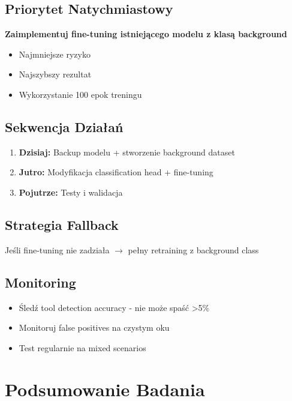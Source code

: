 \documentclass[12pt,a4paper]{article}
\begin{document}
\subsection{Priorytet Natychmiastowy}

\textbf{Zaimplementuj fine-tuning istniejącego modelu z klasą background}
\begin{itemize}
    \item Najmniejsze ryzyko
    \item Najszybszy rezultat
    \item Wykorzystanie 100 epok treningu
\end{itemize}

\subsection{Sekwencja Działań}

\begin{enumerate}
    \item \textbf{Dzisiaj:} Backup modelu + stworzenie background dataset
    \item \textbf{Jutro:} Modyfikacja classification head + fine-tuning
    \item \textbf{Pojutrze:} Testy i walidacja
\end{enumerate}

\subsection{Strategia Fallback}

Jeśli fine-tuning nie zadziała $\rightarrow$ pełny retraining z background class

\subsection{Monitoring}

\begin{itemize}
    \item Śledź tool detection accuracy - nie może spaść >5\%
    \item Monitoruj false positives na czystym oku
    \item Test regularnie na mixed scenarios
\end{itemize}

\section{Podsumowanie Badania}
\end{document}
